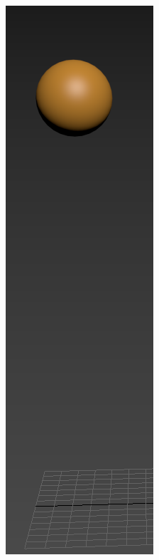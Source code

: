 \documentclass{article}
\begin{document}
\begin{figure}[H]
    \centering 
	\begin{subfigure}[H]{0.15\textwidth}
	    \centering
	    \includegraphics[width=\textwidth]{imagenes/Ejercicio 2/p1.png}

\end{subfigure}
\end{figure}
\end{document}
